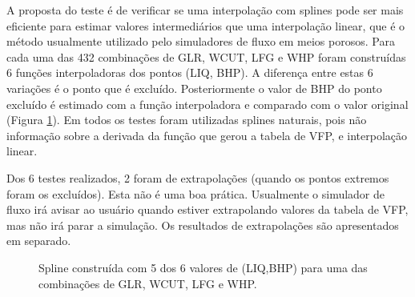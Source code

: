 \documentclass[final,5p]{elsarticle}
\numberwithin{equation}{section}
\begin{document}
        A proposta do teste é de verificar se uma interpolação com splines pode ser mais eficiente para estimar valores intermediários que uma interpolação linear, que é o método usualmente utilizado pelo simuladores de fluxo em meios porosos. Para cada uma das 432 combinações de GLR, WCUT, LFG e WHP foram construídas 6 funções interpoladoras dos pontos (LIQ, BHP). A diferença entre estas 6 variações é o ponto que é excluído. Posteriormente o valor de BHP do ponto excluído é estimado com a função interpoladora e comparado com o valor original (Figura \ref{fig:exvfp}). Em todos os testes foram utilizadas splines naturais, pois não informação sobre a derivada da função que gerou a tabela de VFP, e interpolação linear. 
        
        Dos 6 testes realizados, 2 foram de extrapolações (quando os pontos extremos foram os excluídos). Esta não é uma boa prática. Usualmente o simulador de fluxo irá avisar ao usuário quando estiver extrapolando valores da tabela de VFP, mas não irá parar a simulação. Os resultados de extrapolações são apresentados em separado.

        \begin{figure}[hbt!] 
            \caption{Spline construída com 5 dos 6 valores de (LIQ,BHP) para uma das combinações de GLR, WCUT, LFG e WHP.}
            \label{fig:exvfp}
        \end{figure}
\end{document}
